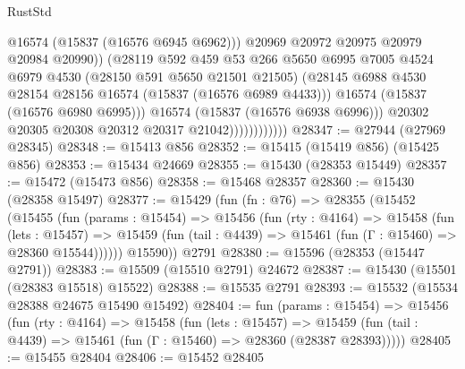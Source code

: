 \begin{lexlean}{RustStd}
\begin{coremodule}
{\begin{coremodule}
{{{{{{{{{{{{{{{{{{{{{{{{{{{{{{{{{{{{{{{{{{{{{{{{{{{{{{{{{{{{                                    @16574
                                    (@15837 (@16576 @6945 @6962)))
                                  @20969
                                  @20972
                                  @20975
                                  @20979
                                  @20984
                                  @20990))
                              (@28119
                                @592
                                @459
                                @53
                                @266
                                @5650
                                @6995
                                @7005
                                @4524
                                @6979
                                @4530
                                (@28150 @591 @5650 @21501 @21505)
                                (@28145
                                  @6988
                                  @4530
                                  @28154
                                  @28156
                                  @16574
                                  (@15837 (@16576 @6989 @4433)))
                                @16574
                                (@15837 (@16576 @6980 @6995)))
                              @16574
                              (@15837 (@16576 @6938 @6996)))
                            @20302
                            @20305
                            @20308
                            @20312
                            @20317
                            @21042))))))))))))
@28347 := @27944 (@27969 @28345)
@28348 := @15413 @856
@28352 := @15415 (@15419 @856) (@15425 @856)
@28353 := @15434 @24669
@28355 := @15430 (@28353 @15449)
@28357 := @15472 (@15473 @856)
@28358 := @15468 @28357
@28360 := @15430 (@28358 @15497)
@28377 := @15429
    (fun (fn : @76) =>
    @28355
      (@15452
        (@15455
          (fun (params : @15454) =>
          @15456
            (fun (rty : @4164) =>
            @15458
              (fun (lets : @15457) =>
              @15459 (fun (tail : @4439) => @15461 (fun (Γ : @15460) => @28360 @15544))))))
        @15590))
    @2791
@28380 := @15596 (@28353 (@15447 @2791))
@28383 := @15509 (@15510 @2791) @24672
@28387 := @15430 (@15501 (@28383 @15518) @15522)
@28388 := @15535 @2791
@28393 := @15532 (@15534 @28388 @24675 @15490 @15492)
@28404 := fun (params : @15454) =>
  @15456
    (fun (rty : @4164) =>
    @15458
      (fun (lets : @15457) =>
      @15459 (fun (tail : @4439) => @15461 (fun (Γ : @15460) => @28360 (@28387 @28393)))))
@28405 := @15455 @28404
@28406 := @15452 @28405
}}}}}}}}}}}}}}}}}}}}}}}}}}}}}}}}}}}}}}}}}}}}}}}}}}}}}}}}}}}}
\end{coremodule}}
\end{coremodule}
\end{lexlean}
